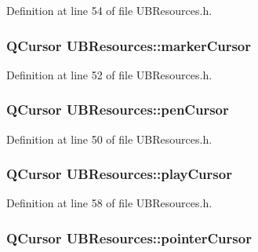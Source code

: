 Definition at line 54 of file U\-B\-Resources.\-h.

\hypertarget{class_u_b_resources_a833fbc6e776701f9c3e45b4a286a1d70}{
\subsubsection[{marker\-Cursor}]{\setlength{\rightskip}{0pt plus 5cm}Q\-Cursor U\-B\-Resources\-::marker\-Cursor}}\label{d8/d23/class_u_b_resources_a833fbc6e776701f9c3e45b4a286a1d70}


Definition at line 52 of file U\-B\-Resources.\-h.

\hypertarget{class_u_b_resources_a498cda238b893be4af2c5f692e015247}{
\subsubsection[{pen\-Cursor}]{\setlength{\rightskip}{0pt plus 5cm}Q\-Cursor U\-B\-Resources\-::pen\-Cursor}}\label{d8/d23/class_u_b_resources_a498cda238b893be4af2c5f692e015247}


Definition at line 50 of file U\-B\-Resources.\-h.

\hypertarget{class_u_b_resources_a05d5101d1cc71a40f502fd285ad54f86}{
\subsubsection[{play\-Cursor}]{\setlength{\rightskip}{0pt plus 5cm}Q\-Cursor U\-B\-Resources\-::play\-Cursor}}\label{d8/d23/class_u_b_resources_a05d5101d1cc71a40f502fd285ad54f86}


Definition at line 58 of file U\-B\-Resources.\-h.

\hypertarget{class_u_b_resources_aeb58734a86bc61559d8d2b561f2aa092}{
\subsubsection[{pointer\-Cursor}]{\setlength{\rightskip}{0pt plus 5cm}Q\-Cursor U\-B\-Resources\-::pointer\-Cursor}}\label{d8/d23/class_u_b_resources_aeb58734a86bc61559d8d2b561f2aa092}


